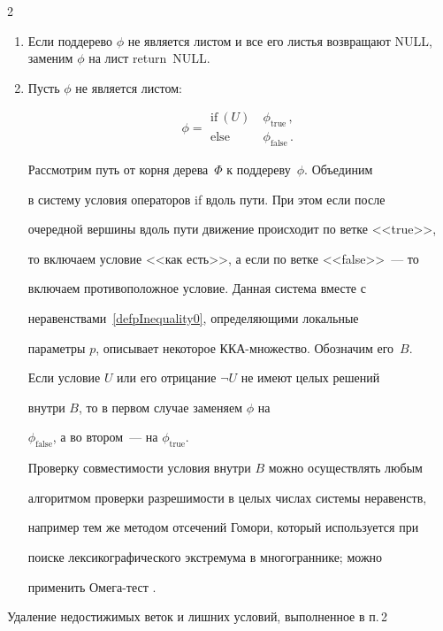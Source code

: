 \begin{multicols}{2}
\begin{enumerate}
\item Если поддерево $\phi$ не является листом и все его листья возвращают NULL, заменим $\phi$ на лист return~NULL.

\item Пусть $\phi$ не является листом:

$$ 

\phi = 

\begin{array}{ll}

\mbox{if}\  (U) &\ \phi_{\mathrm{true}}\,,\\ 

\mbox{else} &\ \phi_{\mathrm{false}}\,.

\end{array}

$$

Рассмотрим путь от корня дерева~$\Phi$ к поддереву~$\phi$. Объединим

в систему условия операторов if вдоль пути. При этом если после

очередной вершины вдоль пути движение происходит по ветке <<true>>,

то включаем условие <<как есть>>, а если по ветке <<false>>~--- то

включаем противоположное условие. Данная система вместе с

неравенствами~\eqref{defpInequality0}, определяющими локальные

параметры $p$, описывает некоторое ККА-мно\-же\-ст\-во. Обозначим его~$B$.



Если условие $U$ или его отрицание $\neg U$ не имеют целых решений

внутри $B$, то в первом случае заменяем $\phi$ на

$\phi_{\mathrm{false}}$, а во втором~--- на $\phi_{\mathrm{true}}$.

Проверку совместимости условия внутри $B$ можно осуществлять любым

алгоритмом проверки разрешимости в целых числах системы неравенств,

например тем же методом отсечений Гомори, который используется при

поиске лексикографического экстремума в многограннике; можно

применить Омега-тест \cite{Pugh}.

\end{enumerate}

Удаление недостижимых веток и лишних условий, выполненное в п.\,2


\end{multicols}

